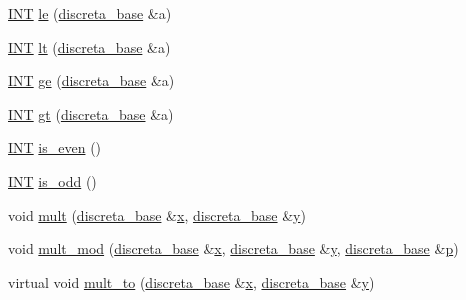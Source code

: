 \begin{DoxyCompactItemize}
\item 
\mbox{\hyperlink{galois_8h_a09fddde158a3a20bd2dcadb609de11dc}{I\+NT}} \mbox{\hyperlink{classdiscreta__base_a2813443682a077fd4112415ee299f087}{le}} (\mbox{\hyperlink{classdiscreta__base}{discreta\+\_\+base}} \&a)
\item 
\mbox{\hyperlink{galois_8h_a09fddde158a3a20bd2dcadb609de11dc}{I\+NT}} \mbox{\hyperlink{classdiscreta__base_a3e17f6a5f027ea3f631a3ba3c540ff3f}{lt}} (\mbox{\hyperlink{classdiscreta__base}{discreta\+\_\+base}} \&a)
\item 
\mbox{\hyperlink{galois_8h_a09fddde158a3a20bd2dcadb609de11dc}{I\+NT}} \mbox{\hyperlink{classdiscreta__base_a06af05fc220a55e844849fe665545c03}{ge}} (\mbox{\hyperlink{classdiscreta__base}{discreta\+\_\+base}} \&a)
\item 
\mbox{\hyperlink{galois_8h_a09fddde158a3a20bd2dcadb609de11dc}{I\+NT}} \mbox{\hyperlink{classdiscreta__base_ac7dbe66505d512c802c0698c13b05605}{gt}} (\mbox{\hyperlink{classdiscreta__base}{discreta\+\_\+base}} \&a)
\item 
\mbox{\hyperlink{galois_8h_a09fddde158a3a20bd2dcadb609de11dc}{I\+NT}} \mbox{\hyperlink{classdiscreta__base_a588ab4fb1bc60455db16ea7d1e6f74ca}{is\+\_\+even}} ()
\item 
\mbox{\hyperlink{galois_8h_a09fddde158a3a20bd2dcadb609de11dc}{I\+NT}} \mbox{\hyperlink{classdiscreta__base_a4fc6a621844c78d4199639ba394c31eb}{is\+\_\+odd}} ()
\item 
void \mbox{\hyperlink{classdiscreta__base_a96f759b28f7c30bdfd95ac10f5972bd0}{mult}} (\mbox{\hyperlink{classdiscreta__base}{discreta\+\_\+base}} \&\mbox{\hyperlink{alphabet2_8_c_a6150e0515f7202e2fb518f7206ed97dc}{x}}, \mbox{\hyperlink{classdiscreta__base}{discreta\+\_\+base}} \&\mbox{\hyperlink{alphabet2_8_c_a0a2f84ed7838f07779ae24c5a9086d33}{y}})
\item 
void \mbox{\hyperlink{classdiscreta__base_a01f00cf6c9f4a8d6209636de98e05c30}{mult\+\_\+mod}} (\mbox{\hyperlink{classdiscreta__base}{discreta\+\_\+base}} \&\mbox{\hyperlink{alphabet2_8_c_a6150e0515f7202e2fb518f7206ed97dc}{x}}, \mbox{\hyperlink{classdiscreta__base}{discreta\+\_\+base}} \&\mbox{\hyperlink{alphabet2_8_c_a0a2f84ed7838f07779ae24c5a9086d33}{y}}, \mbox{\hyperlink{classdiscreta__base}{discreta\+\_\+base}} \&\mbox{\hyperlink{alphabet2_8_c_a533391314665d6bf1b5575e9a9cd8552}{p}})
\item 
virtual void \mbox{\hyperlink{classdiscreta__base_a54d5c16c016769e3365639721c06591e}{mult\+\_\+to}} (\mbox{\hyperlink{classdiscreta__base}{discreta\+\_\+base}} \&\mbox{\hyperlink{alphabet2_8_c_a6150e0515f7202e2fb518f7206ed97dc}{x}}, \mbox{\hyperlink{classdiscreta__base}{discreta\+\_\+base}} \&\mbox{\hyperlink{alphabet2_8_c_a0a2f84ed7838f07779ae24c5a9086d33}{y}})

\end{DoxyCompactItemize}
